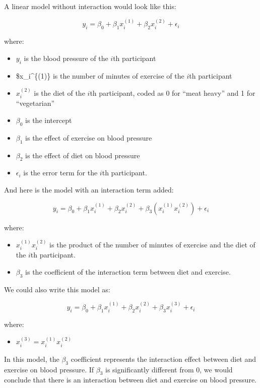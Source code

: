 \documentclass[
  letterpaper,
  8pt,
  a4paper]{book}
\providecommand{\tightlist}{%
  \setlength{\itemsep}{0pt}\setlength{\parskip}{0pt}}
\begin{document}
A linear model without interaction would look like this:

\[y_i = \beta_0 + \beta_1 x_{i}^{(1)} + \beta_2 x_{i}^{(2)} + \epsilon_i\]

where:

\begin{itemize}
\tightlist
\item
  \(y_i\) is the blood pressure of the \(i\)th participant
\item
  \$x\_i\^{}\{(1)\} is the number of minutes of exercise of the \(i\)th
  participant
\item
  \(x_i^{(2)}\) is the diet of the \(i\)th participant, coded as 0 for
  ``meat heavy'' and 1 for ``vegetarian''
\item
  \(\beta_0\) is the intercept
\item
  \(\beta_1\) is the effect of exercise on blood pressure
\item
  \(\beta_2\) is the effect of diet on blood pressure
\item
  \(\epsilon_i\) is the error term for the \(i\)th participant.
\end{itemize}

And here is the model with an interaction term added:

\[y_i = \beta_0 + \beta_1 x_{i}^{(1)} + \beta_2 x_{i}^{(2)} + \beta_3 (x_{i}^{(1)} x_{i}^{(2)}) + \epsilon_i\]

where:

\begin{itemize}
\tightlist
\item
  \(x_{i}^{(1)}x_{i}^{(2)}\) is the product of the number of minutes of
  exercise and the diet of the \(i\)th participant.
\item
  \(\beta_3\) is the coefficient of the interaction term between diet
  and exercise.
\end{itemize}

We could also write this model as:

\[y_i = \beta_0 + \beta_1 x_{i}^{(1)} + \beta_2 x_{i}^{(2)} + \beta_3 x_{i}^{(3)} + \epsilon_i\]

where:

\begin{itemize}
\tightlist
\item
  \(x_{i}^{(3)} = x_{i}^{(1)} x_{i}^{(2)}\)
\end{itemize}

In this model, the \(\beta_3\) coefficient represents the interaction
effect between diet and exercise on blood pressure. If \(\beta_3\) is
significantly different from 0, we would conclude that there is an
interaction between diet and exercise on blood pressure.
\end{document}
